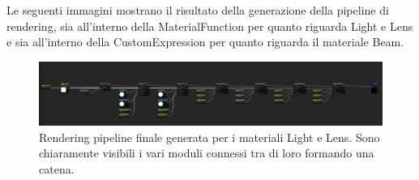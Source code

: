 \documentclass[main.tex]{subfiles}
\begin{document}
Le seguenti immagini mostrano il risultato della generazione  della pipeline di rendering, sia all'interno della MaterialFunction per quanto riguarda Light e Lens e sia all'interno della CustomExpression per quanto riguarda il materiale Beam.
\begin{figure}[H]
    \centering
    \includegraphics[width=1\linewidth]{img/newFeatures/renderPipeline.jpg}
    \caption{Rendering pipeline finale generata per i materiali Light e Lens. Sono chiaramente visibili i vari moduli connessi tra di loro formando una catena.}
    \label{fig:5_finalRenderingPipeline}
\end{figure}
\end{document}
